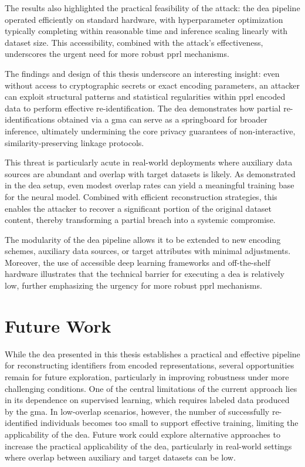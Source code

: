The results also highlighted the practical feasibility of the attack: the \ac{dea} pipeline operated efficiently on standard hardware, with hyperparameter optimization typically completing within reasonable time and inference scaling linearly with dataset size.
This accessibility, combined with the attack's effectiveness, underscores the urgent need for more robust \ac{pprl} mechanisms.

The findings and design of this thesis underscore an interesting insight: even without access to cryptographic secrets or exact encoding parameters, an attacker can exploit structural patterns and statistical regularities within \ac{pprl} encoded data to perform effective re-identification.
The \ac{dea} demonstrates how partial re-identifications obtained via a \ac{gma} can serve as a springboard for broader inference, ultimately undermining the core privacy guarantees of non-interactive, similarity-preserving linkage protocols.

This threat is particularly acute in real-world deployments where auxiliary data sources are abundant and overlap with target datasets is likely.
As demonstrated in the \ac{dea} setup, even modest overlap rates can yield a meaningful training base for the neural model.
Combined with efficient reconstruction strategies, this enables the attacker to recover a significant portion of the original dataset content, thereby transforming a partial breach into a systemic compromise.

The modularity of the \ac{dea} pipeline allows it to be extended to new encoding schemes, auxiliary data sources, or target attributes with minimal adjustments.
Moreover, the use of accessible deep learning frameworks and off-the-shelf hardware illustrates that the technical barrier for executing a \ac{dea} is relatively low, further emphasizing the urgency for more robust \ac{pprl} mechanisms.


\section{Future Work}  \label{sec:future-work}

While the \ac{dea} presented in this thesis establishes a practical and effective pipeline for reconstructing identifiers from encoded representations, several opportunities remain for future exploration, particularly in improving robustness under more challenging conditions.
One of the central limitations of the current approach lies in its dependence on supervised learning, which requires labeled data produced by the \ac{gma}.
In low-overlap scenarios, however, the number of successfully re-identified individuals becomes too small to support effective training, limiting the applicability of the \ac{dea}.
Future work could explore alternative approaches to increase the practical applicability of the \ac{dea}, particularly in real-world settings where overlap between auxiliary and target datasets can be low.

